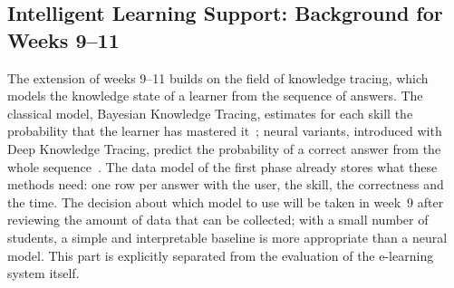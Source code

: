 \subsection{Intelligent Learning Support: Background for Weeks 9--11}

The extension of weeks 9--11 builds on the field of knowledge tracing, which models the knowledge state of a learner from the sequence of answers. The classical model, Bayesian Knowledge Tracing, estimates for each skill the probability that the learner has mastered it~\cite{corbett1995knowledge}; neural variants, introduced with Deep Knowledge Tracing, predict the probability of a correct answer from the whole sequence~\cite{piech2015deep}. The data model of the first phase already stores what these methods need: one row per answer with the user, the skill, the correctness and the time. The decision about which model to use will be taken in week~9 after reviewing the amount of data that can be collected; with a small number of students, a simple and interpretable baseline is more appropriate than a neural model. This part is explicitly separated from the evaluation of the e-learning system itself.
